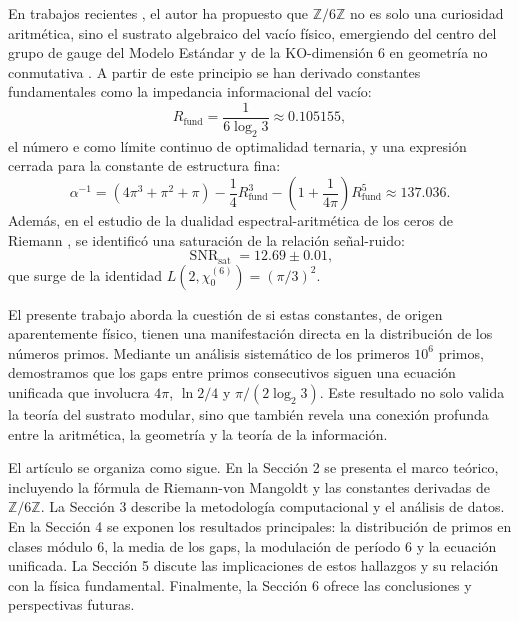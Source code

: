 \documentclass[12pt,a4paper]{article}
\theoremstyle{plain}
\theoremstyle{definition}
\theoremstyle{remark}
\newcommand{\Zmod}{\mathbb{Z}/6\mathbb{Z}}
\newcommand{\euler}{\mathrm{e}}
\newcommand{\SNR}{\operatorname{SNR}}
\newcommand{\Rfund}{R_{\text{fund}}}
\newcommand{\SNRsat}{\SNR_{\text{sat}}}
\begin{document}
En trabajos recientes \cite{PeinadorGenesis, PeinadorSpectrum, PeinadorDSP}, el autor ha propuesto que $\Zmod$ no es solo una curiosidad aritmética, sino el sustrato algebraico del vacío físico, emergiendo del centro del grupo de gauge del Modelo Estándar y de la KO-dimensión $6$ en geometría no conmutativa \cite{Connes2008, Chamseddine2007}. A partir de este principio se han derivado constantes fundamentales como la impedancia informacional del vacío:
\begin{equation}
\Rfund = \frac{1}{6\log_2 3} \approx 0.105155,
\end{equation}
el número $\euler$ como límite continuo de optimalidad ternaria, y una expresión cerrada para la constante de estructura fina:
\begin{equation}
\alpha^{-1} = (4\pi^3 + \pi^2 + \pi) - \frac{1}{4}\Rfund^3 - \left(1 + \frac{1}{4\pi}\right)\Rfund^5 \approx 137.036.
\end{equation}
Además, en el estudio de la dualidad espectral-aritmética de los ceros de Riemann \cite{PeinadorSpectrum}, se identificó una saturación de la relación señal-ruido:
\begin{equation}
\SNRsat = 12.69 \pm 0.01,
\end{equation}
que surge de la identidad $L(2,\chi_0^{(6)}) = (\pi/3)^2$.

El presente trabajo aborda la cuestión de si estas constantes, de origen aparentemente físico, tienen una manifestación directa en la distribución de los números primos. Mediante un análisis sistemático de los primeros $10^6$ primos, demostramos que los gaps entre primos consecutivos siguen una ecuación unificada que involucra $4\pi$, $\ln 2/4$ y $\pi/(2\log_2 3)$. Este resultado no solo valida la teoría del sustrato modular, sino que también revela una conexión profunda entre la aritmética, la geometría y la teoría de la información.

El artículo se organiza como sigue. En la Sección 2 se presenta el marco teórico, incluyendo la fórmula de Riemann-von Mangoldt y las constantes derivadas de $\Zmod$. La Sección 3 describe la metodología computacional y el análisis de datos. En la Sección 4 se exponen los resultados principales: la distribución de primos en clases módulo 6, la media de los gaps, la modulación de período 6 y la ecuación unificada. La Sección 5 discute las implicaciones de estos hallazgos y su relación con la física fundamental. Finalmente, la Sección 6 ofrece las conclusiones y perspectivas futuras.

\end{document}
